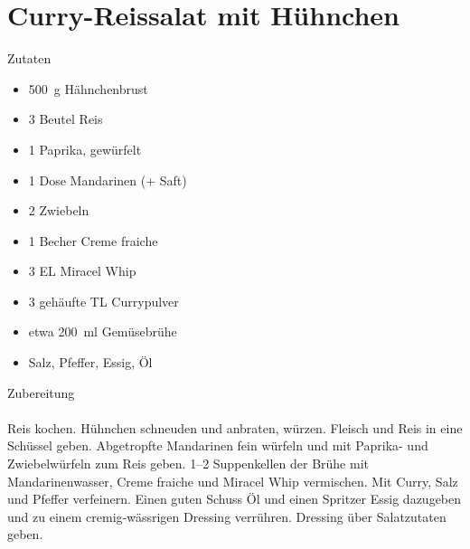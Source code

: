 \section*{Curry-Reissalat mit Hühnchen}
\ihead{}\ohead{}
\cfoot{}
{\Large Zutaten}
\begin{multicols}{2}
\begin{itemize}
    \item \SI{500}{g} Hähnchenbrust
    \item \num{3} Beutel Reis
    \item \num{1} Paprika, gewürfelt
    \item \num{1} Dose Mandarinen (+ Saft)
    \item \num{2} Zwiebeln
    \item \num{1} Becher Creme fraiche
    \item \num{3} EL Miracel Whip
    \item \num{3} gehäufte TL Currypulver
    \item etwa \SI{200}{ml} Gemüsebrühe
    \item Salz, Pfeffer, Essig, Öl
\end{itemize}
\end{multicols}
\noindent
{\Large Zubereitung}\\
\\
Reis kochen.
Hühnchen schneuden und anbraten, würzen.
Fleisch und Reis in eine Schüssel geben. 
Abgetropfte Mandarinen fein würfeln und mit Paprika- und Zwiebelwürfeln zum Reis geben.
\numrange{1}{2} Suppenkellen der Brühe mit Mandarinenwasser, Creme fraiche und Miracel Whip vermischen.
Mit Curry, Salz und Pfeffer verfeinern. 
Einen guten Schuss Öl und einen Spritzer Essig dazugeben und zu einem cremig-wässrigen Dressing verrühren.
Dressing über Salatzutaten geben.